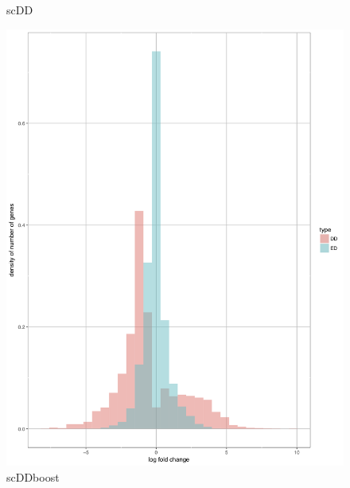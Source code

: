 \documentclass[11pt]{amsart}
\begin{document}
\begin{figure}[ht]
  \caption{scDD}\label{fig:scDD}
\endminipage\hfill
{}
  \includegraphics[width=\linewidth]{DEC_EC_scddb.png}
  \caption{scDDboost}\label{fig:scDDboost}
\endminipage\hfill
{}%

\end{figure}
\end{document}
